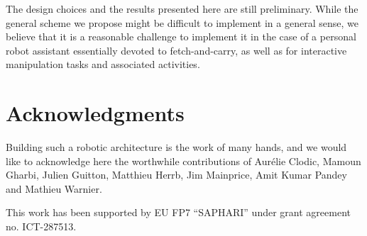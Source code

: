 \documentclass[preprint,3p,times]{elsarticle}
\begin{document}
The design choices and the results presented here are still preliminary.
While the general scheme we propose might be difficult to implement in
a general sense, we believe that it is a reasonable challenge to
implement it in the case of a personal robot assistant essentially
devoted to fetch-and-carry, as well as for interactive manipulation
tasks and associated activities.



\section*{Acknowledgments}

Building such a robotic architecture is the work of many hands, and we would
like to acknowledge here the worthwhile contributions of Aurélie Clodic, Mamoun
Gharbi, Julien Guitton, Matthieu Herrb, Jim Mainprice, Amit Kumar Pandey and
Mathieu Warnier.

This work has been supported by EU FP7 ``SAPHARI'' under grant agreement no.
ICT-287513.



%

\end{document}
